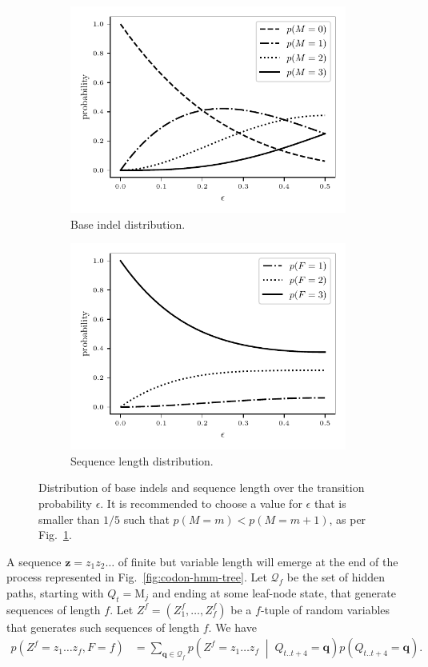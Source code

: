 \documentclass[a4paper]{article}
\theoremstyle{definition}
\theoremstyle{definition}
\theoremstyle{definition}
\newcommand{\cprob}[2]{p\left(#1\;\middle|\; #2\right)}
\newcommand{\eps}{\epsilon}
\begin{document}
\begin{figure}[htbp]
\centering
\begin{subfigure}{.5\textwidth}
  \centering
  \includegraphics[width=.7\linewidth]{indel-prob}
  \caption{Base indel distribution.}%
  \label{fig:indel-dist}
\end{subfigure}%
\begin{subfigure}{.5\textwidth}
  \centering
  \includegraphics[width=.7\linewidth]{seq-len-prob}
  \caption{Sequence length distribution.}%
  \label{fig:len-dist}
\end{subfigure}
\caption{
    Distribution of base indels and sequence length over the transition probability $\eps$.
    It is recommended to choose a value for $\eps$ that is smaller than $1/5$ such that
    $p(M=m)<p(M=m+1)$, as per Fig.~\ref{fig:indel-dist}.
}
\label{fig:dist}
\end{figure}

A sequence $\mathbf z=z_1 z_2\dots$ of finite but variable length will emerge at the end of the
process represented in Fig.~\ref{fig:codon-hmm-tree}.
Let $\mathcal Q_f$ be the set of hidden paths, starting with $Q_t=\mathrm M_j$ and ending at some leaf-node state,
that generate sequences of length $f$.
Let $Z^f=(Z^f_1, \dots, Z^f_f)$ be a $f$-tuple of random variables that generates such sequences of length $f$.
We have
\begin{align*}
    p(Z^f=z_1\dots z_f,F=f) &= \sum_{\mathbf q \in \mathcal Q_f}
    \cprob{Z^f=z_1\dots z_f}{Q_{t..t+4}=\mathbf q} p(Q_{t..t+4}=\mathbf q).
\end{align*}
\end{document}
